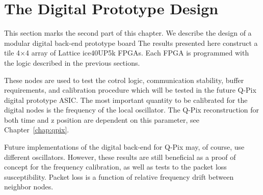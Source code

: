 \section{The Digital Prototype Design}

This section marks the second part of this chapter.
We describe the design of a modular digital back-end prototype board
The results presented here construct a tile 4$\times$4 array of Lattice ice40UP5k FPGAs.
Each FPGA is programmed with the logic described in the previous sections.

These nodes are used to test the cotrol logic, communication stability, buffer requirements, and calibration procedure which will be tested in the future Q-Pix digital prototype ASIC.
The most important quantity to be calibrated for the digital nodes is the frequency of the local oscillator.
The Q-Pix reconstruction for both time and z position are dependent on this parameter, see Chapter~\ref{chap:qpix}.

Future implementations of the digital back-end for Q-Pix may, of course, use different oscillators.
However, these results are still beneficial as a proof of concept for the frequency calibration, as well as tests to the packet loss susceptibility.
Packet loss is a function of relative frequency drift between neighbor nodes.

